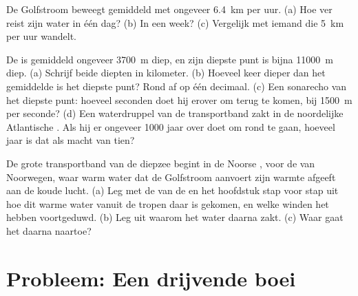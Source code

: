 \begin{exercise}[$\star\star$]\label{exo:g8:the-oceans:10}
De Golfstroom beweegt gemiddeld met ongeveer \qty{6.4}{km} per uur. (a) Hoe
ver reist zijn water in één dag? (b) In een week? (c) Vergelijk met iemand
die \qty{5}{km} per uur wandelt.
\end{exercise}

\begin{exercise}[$\star\star\star$]\label{exo:g8:the-oceans:11}
De  is gemiddeld ongeveer \qty{3700}{m} diep, en zijn diepste punt
is bijna \qty{11000}{m} diep. (a) Schrijf beide diepten in kilometer.
(b) Hoeveel keer dieper dan het gemiddelde is het diepste punt? Rond af
op één decimaal. (c) Een sonarecho van het diepste punt: hoeveel seconden
doet hij erover om terug te komen, bij \qty{1500}{m} per seconde? (d) Een
waterdruppel van de transportband zakt in de noordelijke Atlantische
. Als hij er ongeveer \num{1000} jaar over doet om rond te gaan,
hoeveel jaar is dat als macht van tien?
\end{exercise}

\begin{exercise}[$\star\star\star$]\label{exo:g8:the-oceans:12}
De grote transportband van de diepzee begint in de Noorse , voor de
 van Noorwegen, waar warm water dat de Golfstroom aanvoert zijn warmte
afgeeft aan de koude lucht. (a) Leg met de  van de  en het
hoofdstuk stap voor stap uit hoe dit warme water vanuit de tropen daar is
gekomen, en welke winden het hebben voortgeduwd. (b) Leg uit waarom het
water daarna zakt. (c) Waar gaat het daarna naartoe?
\end{exercise}

\section{Probleem: Een drijvende boei}

